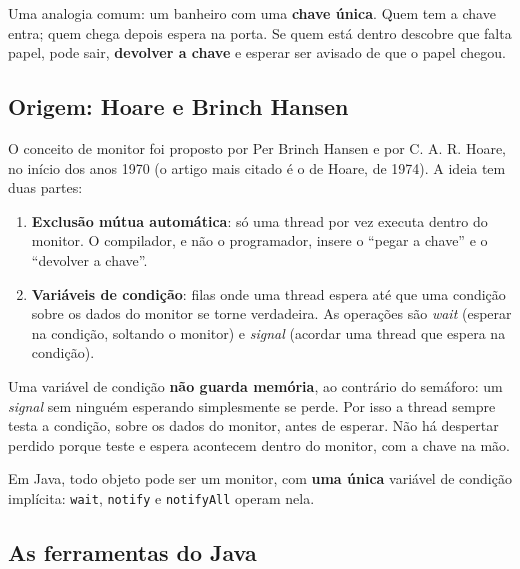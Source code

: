 \documentclass[11pt,a4paper]{article}
\newcommand{\cmd}[1]{\texttt{#1}}
\begin{document}
Uma analogia comum: um banheiro com uma \textbf{chave única}. Quem tem a chave entra; quem chega depois espera na porta. Se quem está dentro descobre que falta papel, pode sair, \textbf{devolver a chave} e esperar ser avisado de que o papel chegou.

\subsection{Origem: Hoare e Brinch Hansen}

O conceito de monitor foi proposto por Per Brinch Hansen e por C. A. R. Hoare, no início dos anos 1970 (o artigo mais citado é o de Hoare, de 1974). A ideia tem duas partes:

\begin{enumerate}
    \item \textbf{Exclusão mútua automática}: só uma thread por vez executa dentro do monitor. O compilador, e não o programador, insere o ``pegar a chave'' e o ``devolver a chave''.
    \item \textbf{Variáveis de condição}: filas onde uma thread espera até que uma condição sobre os dados do monitor se torne verdadeira. As operações são \emph{wait} (esperar na condição, soltando o monitor) e \emph{signal} (acordar uma thread que espera na condição).
\end{enumerate}

Uma variável de condição \textbf{não guarda memória}, ao contrário do semáforo: um \emph{signal} sem ninguém esperando simplesmente se perde. Por isso a thread sempre testa a condição, sobre os dados do monitor, antes de esperar. Não há despertar perdido porque teste e espera acontecem dentro do monitor, com a chave na mão.

Em Java, todo objeto pode ser um monitor, com \textbf{uma única} variável de condição implícita: \cmd{wait}, \cmd{notify} e \cmd{notifyAll} operam nela.

\subsection{As ferramentas do Java}
\end{document}
